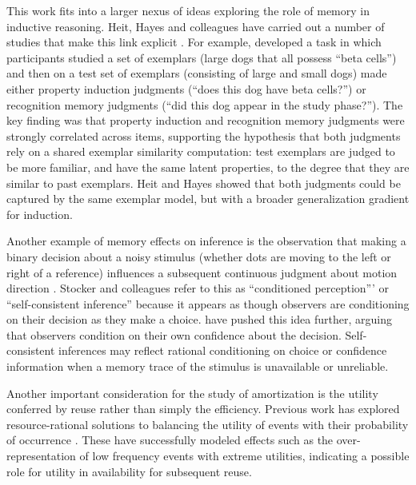 This work fits into a larger nexus of ideas exploring the role of memory in inductive reasoning. Heit, Hayes and colleagues have carried out a number of studies that make this link explicit \citep{heit2011predicting,hayes2013relationship,hayes2013similar,hawkins2016dynamic}. For example, \citet{heit2011predicting} developed a task in which participants studied a set of exemplars (large dogs that all possess ``beta cells'') and then on a test set of exemplars (consisting of large and small dogs) made either property induction judgments (``does this dog have beta cells?'') or recognition memory judgments (``did this dog appear in the study phase?''). The key finding was that property induction and recognition memory judgments were strongly correlated across items, supporting the hypothesis that both judgments rely on a shared exemplar similarity computation: test exemplars are judged to be more familiar, and have the same latent properties, to the degree that they are similar to past exemplars. Heit and Hayes showed that both judgments could be captured by the same exemplar model, but with a broader generalization gradient for induction.

Another example of memory effects on inference is the observation that making a binary decision about a noisy stimulus (whether dots are moving to the left or right of a reference) influences a subsequent continuous judgment about motion direction \citep{jazayeri2007new}. Stocker and colleagues \citep{stocker2008bayesian,luu2016choice} refer to this as ``conditioned perception''' or ``self-consistent inference'' because it appears as though observers are conditioning on their decision as they make a choice. \citet{fleming2017self} have pushed this idea further, arguing that observers condition on their own confidence about the decision. Self-consistent inferences may reflect rational conditioning on choice or confidence information when a memory trace of the stimulus is unavailable or unreliable.


Another important consideration for the study of amortization is the utility conferred by reuse rather than simply the efficiency. Previous work has explored resource-rational solutions to balancing the utility of events with their probability of occurrence \citep{lieder2018overrepresentation, gershman2010neural,lieder2012burn,vul2014one}. These have successfully modeled effects such as the over-representation of low frequency events with extreme utilities, indicating a possible role for utility in availability for subsequent reuse.

